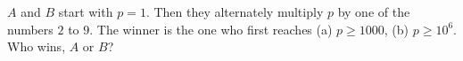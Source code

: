 $A$ and $B$ start with $p = 1$. Then they alternately multiply $p$ by one of the numbers $2$ to $9$. The winner is the one who first reaches (a) $p \geq 1000$, (b) $p \geq 10^6$. Who wins, $A$ or $B$?
